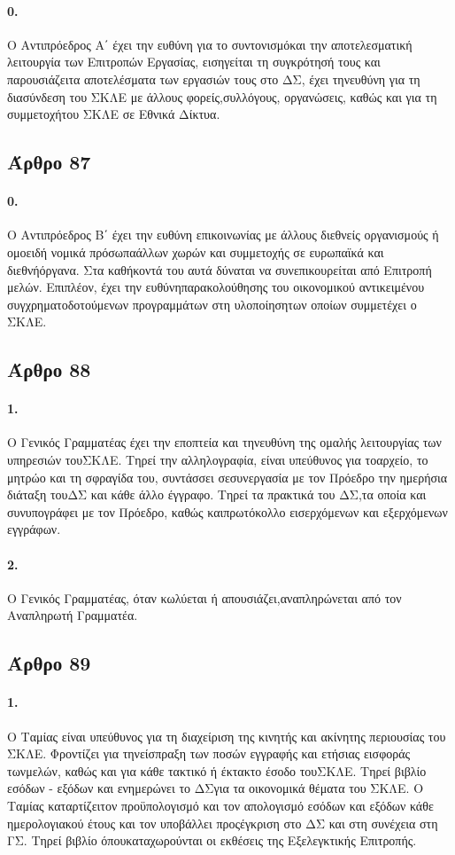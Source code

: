 \documentclass[a4paper,oneside, 10pt]{book}
\begin{document}
\paragraph { 0. } Ο Αντιπρόεδρος Α΄ έχει την ευθύνη για το συντονισμόκαι την αποτελεσματική λειτουργία των Επιτροπών Εργασίας, εισηγείται τη συγκρότησή τους και παρουσιάζειτα αποτελέσματα των εργασιών τους στο ΔΣ, έχει τηνευθύνη για τη διασύνδεση του ΣΚΛΕ με άλλους φορείς,συλλόγους, οργανώσεις, καθώς και για τη συμμετοχήτου ΣΚΛΕ σε Εθνικά Δίκτυα.
\subsection*{ Άρθρο 87 }
\paragraph { 0. } Ο Αντιπρόεδρος Β΄ έχει την ευθύνη επικοινωνίας με άλλους διεθνείς οργανισμούς ή ομοειδή νομικά πρόσωπαάλλων χωρών και συμμετοχής σε ευρωπαϊκά και διεθνήόργανα. Στα καθήκοντά του αυτά δύναται να συνεπικουρείται από Επιτροπή μελών. Επιπλέον, έχει την ευθύνηπαρακολούθησης του οικονομικού αντικειμένου συγχρηματοδοτούμενων προγραμμάτων στη υλοποίησητων οποίων συμμετέχει ο ΣΚΛΕ.
\subsection*{ Άρθρο 88 }
\paragraph { 1. } Ο Γενικός Γραμματέας έχει την εποπτεία και τηνευθύνη της ομαλής λειτουργίας των υπηρεσιών τουΣΚΛΕ. Τηρεί την αλληλογραφία, είναι υπεύθυνος για τοαρχείο, το μητρώο και τη σφραγίδα του, συντάσσει σεσυνεργασία με τον Πρόεδρο την ημερήσια διάταξη τουΔΣ και κάθε άλλο έγγραφο. Τηρεί τα πρακτικά του ΔΣ,τα οποία και συνυπογράφει με τον Πρόεδρο, καθώς καιπρωτόκολλο εισερχόμενων και εξερχόμενων εγγράφων.
\paragraph { 2. } Ο Γενικός Γραμματέας, όταν κωλύεται ή απουσιάζει,αναπληρώνεται από τον Αναπληρωτή Γραμματέα.
\subsection*{ Άρθρο 89 }
\paragraph { 1. } Ο Ταμίας είναι υπεύθυνος για τη διαχείριση της κινητής και ακίνητης περιουσίας του ΣΚΛΕ. Φροντίζει για τηνείσπραξη των ποσών εγγραφής και ετήσιας εισφοράς τωνμελών, καθώς και για κάθε τακτικό ή έκτακτο έσοδο τουΣΚΛΕ. Τηρεί βιβλίο εσόδων - εξόδων και ενημερώνει το ΔΣγια τα οικονομικά θέματα του ΣΚΛΕ. Ο Ταμίας καταρτίζειτον προϋπολογισμό και τον απολογισμό εσόδων και εξόδων κάθε ημερολογιακού έτους και τον υποβάλλει προςέγκριση στο ΔΣ και στη συνέχεια στη ΓΣ. Τηρεί βιβλίο όπουκαταχωρούνται οι εκθέσεις της Εξελεγκτικής Επιτροπής.
\end{document}
